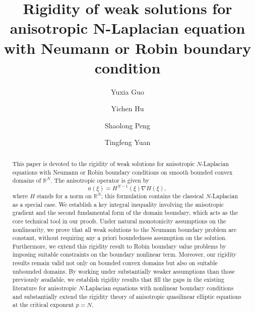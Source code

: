 \documentclass[reqno, 11pt]{amsart} %
\numberwithin{equation}{section}
\theoremstyle{definition}
\begin{document}
\title[Anisotropic N-Laplacian equation]
{Rigidity of weak solutions for anisotropic N-Laplacian equation with Neumann or Robin boundary condition}

\author{Yuxia Guo}
\address[Yuxia Guo]{Department of Mathematical Sciences, Tsinghua University, Beijing, P.R. China}

\author{Yichen Hu}
\address[Yichen Hu]{School of Mathematical Sciences, Dalian University of Technology, Dalian, Liaoning, P. R. China}

\author{Shaolong Peng}
\address[Shaolong Peng]{School of Mathematical Sciences, Beihang University (BUAA), Beijing, P.R. China}

\author{Tingfeng Yuan}
\address[Tingfeng Yuan]{Department of Mathematical Sciences, Tsinghua University, Beijing, P. R. China}

\begin{abstract}
This paper is devoted to the rigidity of weak solutions for anisotropic $N$-Laplacian equations with Neumann or Robin boundary conditions on smooth bounded convex domains of $\mathbb{R}^N$. The anisotropic operator is given by $$a(\xi) = H^{N-1}(\xi)\nabla H(\xi),$$
where $H$ stands for a norm on $\mathbb{R}^N$; this formulation contains the classical $N$-Laplacian as a special case. We establish a key integral inequality involving the anisotropic gradient and the second fundamental form of the domain boundary, which acts as the core technical tool in our proofs. Under natural monotonicity assumptions on the nonlinearity, we prove that all weak solutions to the Neumann boundary problem are constant, without requiring any a priori boundedness assumption on the solution. Furthermore, we extend this rigidity result to Robin boundary value problems by imposing suitable constraints on the boundary nonlinear term. Moreover, our rigidity results remain valid not only on bounded convex domains but also on suitable unbounded domains. By working under substantially weaker assumptions than those previously available, we establish rigidity results that fill the gaps in the existing literature for anisotropic $N$-Laplacian equations with nonlinear boundary conditions and substantially extend the rigidity theory of anisotropic quasilinear elliptic equations at the critical exponent $p=N$.
\end{abstract}

\date{}
\maketitle
\end{document}
